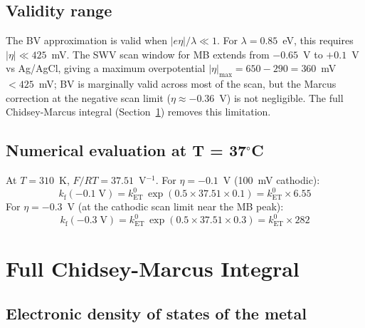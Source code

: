 \documentclass[10pt,a4paper]{article}
\numberwithin{equation}{section}
\newcommand{\kET}{k_{\text{ET}}^{0}}
\newcommand{\kf}{k_{\text{f}}}
\begin{document}
\subsection{Validity range}

The BV approximation is valid when
$|e\eta |/\lambda \ll 1$. For $\lambda = 0.85$~eV, this requires
$|\eta| \ll 425$~mV. The SWV scan window for MB extends from
$-0.65$~V to $+0.1$~V vs Ag/AgCl, giving a maximum overpotential
$|\eta|_{\max} = 650 - 290 = 360$~mV $< 425$~mV; BV is marginally
valid across most of the scan, but the Marcus correction at the
negative scan limit ($\eta \approx -0.36$~V) is not negligible.
The full Chidsey-Marcus integral (Section~\ref{sec:chidsey}) removes
this limitation.

\subsection{Numerical evaluation at T = 37$^\circ$C}

At $T = 310$~K, $F/RT = 37.51$~V$^{-1}$. For $\eta = -0.1$~V
(100~mV cathodic):
\begin{equation}
  \kf(-0.1\;\text{V}) = \kET\,\exp(0.5 \times 37.51 \times 0.1)
  = \kET \times 6.55
\end{equation}
For $\eta = -0.3$~V (at the cathodic scan limit near the MB peak):
\begin{equation}
  \kf(-0.3\;\text{V}) = \kET\,\exp(0.5 \times 37.51 \times 0.3)
  = \kET \times 282
\end{equation}

\section{Full Chidsey-Marcus Integral}
\label{sec:chidsey}

\subsection{Electronic density of states of the metal}
\end{document}
